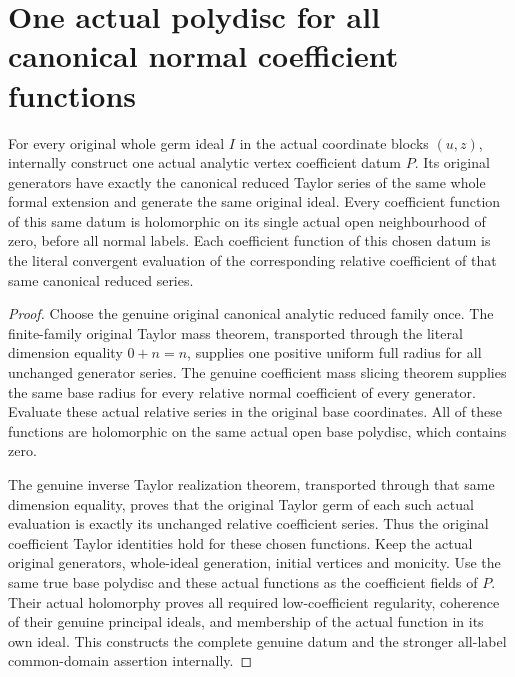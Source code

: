 \section{One actual polydisc for all canonical normal coefficient functions}

\begin{theorem}
\label{hir:actual-uniform-canonical-coefficient-functions}
\leanok
For every original whole germ ideal $I$ in the actual coordinate blocks
$(u,z)$, internally construct one actual analytic vertex coefficient datum
$P$. Its original generators have exactly the canonical reduced Taylor
series of the same whole formal extension and generate the same original
ideal. Every coefficient function of this same datum is holomorphic on
its single actual open neighbourhood of zero, before all normal labels.
Each coefficient function of this chosen datum is the literal convergent evaluation of the
corresponding relative coefficient of that same canonical reduced series.
\end{theorem}
\begin{proof}
Choose the genuine original canonical analytic reduced family once.
The finite-family original Taylor mass theorem, transported through the
literal dimension equality $0+n=n$, supplies one positive uniform full
radius for all unchanged generator series. The genuine coefficient mass
slicing theorem supplies the same base radius for every relative normal
coefficient of every generator. Evaluate these actual relative series
in the original base coordinates. All of these functions are holomorphic
on the same actual open base polydisc, which contains zero.

The genuine inverse Taylor realization theorem, transported through that
same dimension equality, proves that the original Taylor germ of each
such actual evaluation is exactly its unchanged relative coefficient
series. Thus the original coefficient Taylor identities hold for these
chosen functions. Keep the actual original generators, whole-ideal
generation, initial vertices and monicity. Use the same true base
polydisc and these actual functions as the coefficient fields of $P$.
Their actual holomorphy proves all required low-coefficient regularity,
coherence of their genuine principal ideals, and membership of the
actual function in its own ideal. This constructs the complete genuine
datum and the stronger all-label common-domain assertion internally.
\end{proof}

